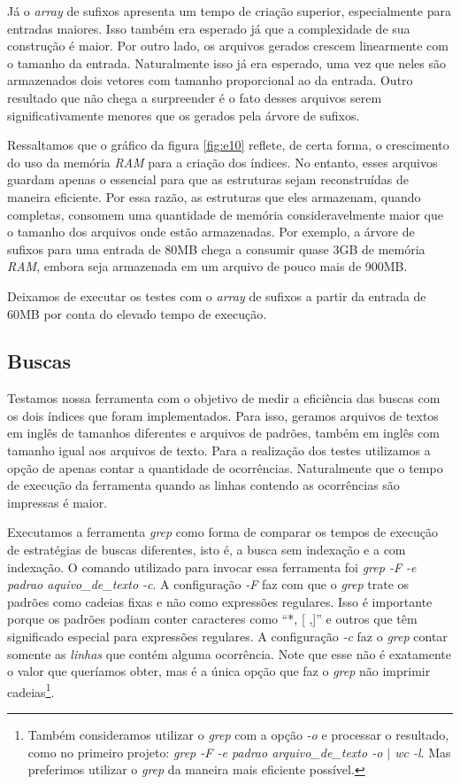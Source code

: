 \documentclass[]{article}
\newcommand{\figref}[1]{figura \ref{#1}}
\begin{document}
Já o \textit{array} de sufixos apresenta um tempo de criação superior, especialmente para entradas maiores. Isso também era esperado já que a complexidade de sua construção é maior. Por outro lado, os arquivos gerados crescem linearmente com o tamanho da entrada. Naturalmente isso já era esperado, uma vez que neles são armazenados dois vetores com tamanho proporcional ao da entrada. Outro resultado que não chega a surpreender é o fato desses arquivos serem significativamente menores que os gerados pela árvore de sufixos.


Ressaltamos que o gráfico da \figref{fig:e10} reflete, de certa forma, o crescimento do uso da memória \textit{RAM} para a criação dos índices. No entanto, esses arquivos guardam apenas o essencial para que as estruturas sejam reconstruídas de maneira eficiente. Por essa razão, as estruturas que eles armazenam, quando completas, consomem uma quantidade de memória consideravelmente maior que o tamanho dos arquivos onde estão armazenadas. Por exemplo, a árvore de sufixos para uma entrada de 80MB chega a consumir quase 3GB de memória \textit{RAM}, embora seja armazenada em um arquivo de pouco mais de 900MB.

Deixamos de executar os testes com o \textit{array} de sufixos a partir da entrada de 60MB por conta do elevado tempo de execução. 

\subsection{Buscas}

Testamos nossa ferramenta com o objetivo de medir a eficiência das buscas com os dois índices que foram implementados. Para isso, geramos arquivos de textos em inglês de tamanhos diferentes e arquivos de padrões, também em inglês com tamanho igual aos arquivos de texto. Para a realização dos testes utilizamos a opção de apenas contar a quantidade de ocorrências. Naturalmente que o tempo de execução da ferramenta quando as linhas contendo as ocorrências são impressas é maior.

Executamos a ferramenta \textit{grep} como forma de comparar os tempos de execução de estratégias de buscas diferentes, isto é, a busca sem indexação e a com indexação. O comando utilizado para invocar essa ferramenta foi \textit{grep -F -e padrao aquivo\_de\_texto -c}. A configuração \textit{-F} faz com que o \textit{grep} trate os padrões como cadeias fixas e não como expressões regulares. Isso é importante porque os padrões podiam conter caracteres como ``*, [ ,]'' e outros que têm significado especial para expressões regulares. A configuração \textit{-c} faz o \textit{grep} contar somente as \textit{linhas} que contém alguma ocorrência. Note que esse não é exatamente o valor que queríamos obter, mas é a única opção que faz o \textit{grep} não imprimir cadeias\footnote{Também consideramos utilizar o \textit{grep} com a opção \textit{-o} e processar o resultado, como no primeiro projeto: \textit{grep -F -e padrao arquivo\_de\_texto -o $\vert$ wc -l}. Mas preferimos utilizar o \textit{grep} da maneira mais eficiente possível.}.
\end{document}
